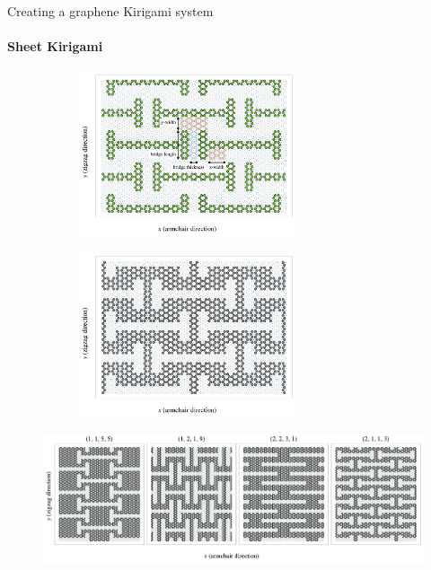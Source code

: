\documentclass[
	10pt, %
]{beamer}
\begin{document}
%
%
\begin{frame}{Creating a graphene Kirigami system}
	\framesubtitle{Sheet Kirigami}


	\begin{figure}[H]
		\centering
		\begin{subfigure}[t]{0.48\textwidth}
			\centering
			\raggedleft
			\includegraphics[width=0.7\textwidth]{../thesis/figures/system/honeycomb_inverse.pdf}
		  \end{subfigure}
		  \hfill
		  \begin{subfigure}[t]{0.48\textwidth}
			\centering
			\raggedright
			\includegraphics[width=0.7\textwidth]{../thesis/figures/system/honeycomb_pattern.pdf}
		\end{subfigure}
	  \end{figure}
	  
	  
	  \begin{figure}[H]
		\centering
		\includegraphics[width=\linewidth]{../thesis/figures/system/honeycomb_flavors.pdf}
	  \end{figure}
\end{frame}
\end{document}
